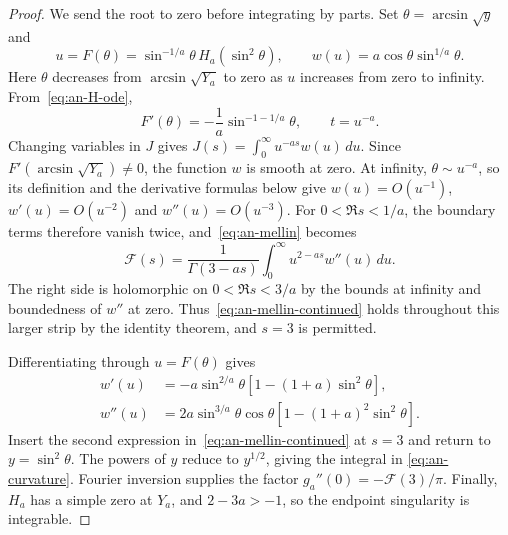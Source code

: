 \begin{proof}
We send the root to zero before integrating by parts. Set $\theta=\arcsin\sqrt y$ and
\[
 u=F(\theta)=\sin^{-1/a}\theta\,H_a(\sin^2\theta),\qquad
 w(u)=a\cos\theta\sin^{1/a}\theta.
\]
Here $\theta$ decreases from $\arcsin\sqrt{Y_a}$ to zero as
$u$ increases from zero to infinity. From~\eqref{eq:an-H-ode},
\[
 F'(\theta)=-\frac1a\sin^{-1-1/a}\theta,\qquad t=u^{-a}.
\]
Changing variables in $J$ gives
$J(s)=\int_0^\infty u^{-as}w(u)\,d u$.
Since $F'(\arcsin\sqrt{Y_a})\ne0$, the function $w$ is smooth
at zero. At infinity, $\theta\sim u^{-a}$, so its definition
and the derivative formulas below give
$w(u)=O(u^{-1})$, $w'(u)=O(u^{-2})$ and $w''(u)=O(u^{-3})$.
For $0<\Re s<1/a$, the boundary terms therefore vanish twice,
and~\eqref{eq:an-mellin} becomes
\begin{equation}\label{eq:an-mellin-continued}
 \mathcal F(s)=\frac{1}{\Gamma(3-as)}
       \int_0^\infty u^{2-as}w''(u)\,d u.
\end{equation}
The right side is holomorphic on $0<\Re s<3/a$ by the bounds
at infinity and boundedness of $w''$ at zero.
Thus~\eqref{eq:an-mellin-continued} holds throughout this larger
strip by the identity theorem, and $s=3$ is permitted.

Differentiating through $u=F(\theta)$ gives
\[
 \begin{split}
 w'(u)&=-a\sin^{2/a}\theta
                  [1-(1+a)\sin^2\theta],\\
 w''(u)&=2a\sin^{3/a}\theta\cos\theta
                  [1-(1+a)^2\sin^2\theta].
 \end{split}
\]
Insert the second expression in~\eqref{eq:an-mellin-continued}
at $s=3$ and return to $y=\sin^2\theta$.
The powers of $y$ reduce to $y^{1/2}$, giving the integral in
\eqref{eq:an-curvature}. Fourier inversion supplies the factor
$g_a''(0)=-\mathcal F(3)/\pi$.
Finally, $H_a$ has a simple zero at $Y_a$, and $2-3a>-1$,
so the endpoint singularity is integrable.
\end{proof}

